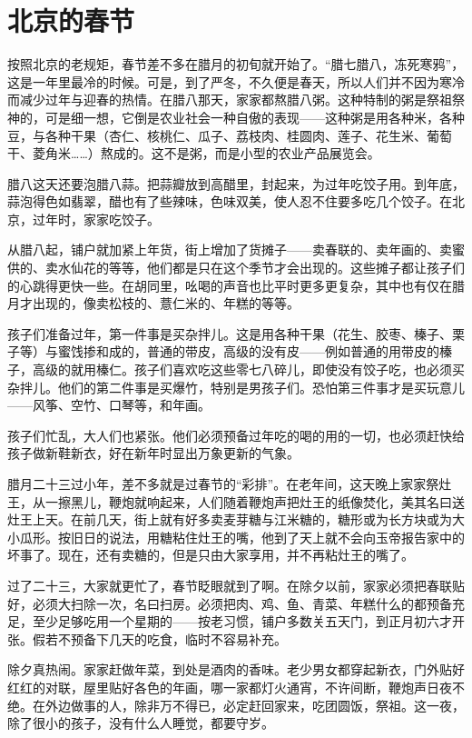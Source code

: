 \documentclass[12pt,UTF-8,openany]{ctexbook}
\begin{document}
\chapter{北京的春节}

\begin{Large}
    
    按照北京的老规矩，春节差不多在腊月的初旬就开始了。“腊七腊八，冻死寒鸦”，这是一年里最冷的时候。可是，到了严冬，不久便是春天，所以人们并不因为寒冷而减少过年与迎春的热情。在腊八那天，家家都熬腊八粥。这种特制的粥是祭祖祭神的，可是细一想，它倒是农业社会一种自傲的表现——这种粥是用各种米，各种豆，与各种干果（杏仁、核桃仁、瓜子、荔枝肉、桂圆肉、莲子、花生米、葡萄干、菱角米……）熬成的。这不是粥，而是小型的农业产品展览会。
    
    腊八这天还要泡腊八蒜。把蒜瓣放到高醋里，封起来，为过年吃饺子用。到年底，蒜泡得色如翡翠，醋也有了些辣味，色味双美，使人忍不住要多吃几个饺子。在北京，过年时，家家吃饺子。
    
    从腊八起，铺户就加紧上年货，街上增加了货摊子——卖春联的、卖年画的、卖蜜供的、卖水仙花的等等，他们都是只在这个季节才会出现的。这些摊子都让孩子们的心跳得更快一些。在胡同里，吆喝的声音也比平时更多更复杂，其中也有仅在腊月才出现的，像卖松枝的、薏仁米的、年糕的等等。
    
    孩子们准备过年，第一件事是买杂拌儿。这是用各种干果（花生、胶枣、榛子、栗子等）与蜜饯掺和成的，普通的带皮，高级的没有皮——例如普通的用带皮的榛子，高级的就用榛仁。孩子们喜欢吃这些零七八碎儿，即使没有饺子吃，也必须买杂拌儿。他们的第二件事是买爆竹，特别是男孩子们。恐怕第三件事才是买玩意儿——风筝、空竹、口琴等，和年画。
    
    孩子们忙乱，大人们也紧张。他们必须预备过年吃的喝的用的一切，也必须赶快给孩子做新鞋新衣，好在新年时显出万象更新的气象。
    
    腊月二十三过小年，差不多就是过春节的“彩排”。在老年间，这天晚上家家祭灶王，从一擦黑儿，鞭炮就响起来，人们随着鞭炮声把灶王的纸像焚化，美其名曰送灶王上天。在前几天，街上就有好多卖麦芽糖与江米糖的，糖形或为长方块或为大小瓜形。按旧日的说法，用糖粘住灶王的嘴，他到了天上就不会向玉帝报告家中的坏事了。现在，还有卖糖的，但是只由大家享用，并不再粘灶王的嘴了。
    
    过了二十三，大家就更忙了，春节眨眼就到了啊。在除夕以前，家家必须把春联贴好，必须大扫除一次，名曰扫房。必须把肉、鸡、鱼、青菜、年糕什么的都预备充足，至少足够吃用一个星期的——按老习惯，铺户多数关五天门，到正月初六才开张。假若不预备下几天的吃食，临时不容易补充。
    
    除夕真热闹。家家赶做年菜，到处是酒肉的香味。老少男女都穿起新衣，门外贴好红红的对联，屋里贴好各色的年画，哪一家都灯火通宵，不许间断，鞭炮声日夜不绝。在外边做事的人，除非万不得已，必定赶回家来，吃团圆饭，祭祖。这一夜，除了很小的孩子，没有什么人睡觉，都要守岁。
    

\end{Large}
\end{document}
